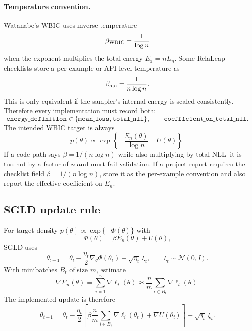 \documentclass[11pt]{article}
\begin{document}
\paragraph{Temperature convention.}  Watanabe's WBIC uses inverse temperature
\begin{equation}
  \beta_{\rm WBIC} = \frac{1}{\log n}
\end{equation}
when the exponent multiplies the total energy $E_n=nL_n$.  Some RelaLeap checklists store a per-example or API-level temperature as
\begin{equation}
  \beta_{\rm api} = \frac{1}{n\log n}.
\end{equation}
This is only equivalent if the sampler's internal energy is scaled consistently.  Therefore every implementation must record both:
\begin{equation}
  \texttt{energy\_definition} \in \{\texttt{mean\_loss},\texttt{total\_nll}\},
  \qquad
  \texttt{coefficient\_on\_total\_nll}.
\end{equation}
The intended WBIC target is always
\begin{equation}
  p(\theta) \propto \exp\left\{-\frac{E_n(\theta)}{\log n} - U(\theta)\right\}.
\end{equation}
If a code path says $\beta=1/(n\log n)$ while also multiplying by total NLL, it is too hot by a factor of $n$ and must fail validation.  If a project report requires the checklist field $\beta=1/(n\log n)$, store it as the per-example convention and also report the effective coefficient on $E_n$.

\subsection{SGLD update rule}

For target density $p(\theta) \propto \exp\{-\Phi(\theta)\}$ with
\begin{equation}
  \Phi(\theta) = \beta E_n(\theta) + U(\theta),
\end{equation}
SGLD uses
\begin{equation}
  \theta_{t+1}
  = \theta_t
  - \frac{\eta_t}{2}\nabla_\theta \Phi(\theta_t)
  + \sqrt{\eta_t}\,\xi_t,
  \qquad
  \xi_t \sim \mathcal{N}(0,I).
\end{equation}
With minibatches $B_t$ of size $m$, estimate
\begin{equation}
  \nabla E_n(\theta)
  = \sum_{i=1}^n \nabla \ell_i(\theta)
  \approx
  \frac{n}{m}\sum_{i\in B_t}\nabla \ell_i(\theta).
\end{equation}
The implemented update is therefore
\begin{equation}
  \theta_{t+1}
  = \theta_t
  - \frac{\eta_t}{2}
  \left[\beta\frac{n}{m}\sum_{i\in B_t}\nabla\ell_i(\theta_t)
        + \nabla U(\theta_t)\right]
  + \sqrt{\eta_t}\,\xi_t.
\end{equation}
\end{document}
